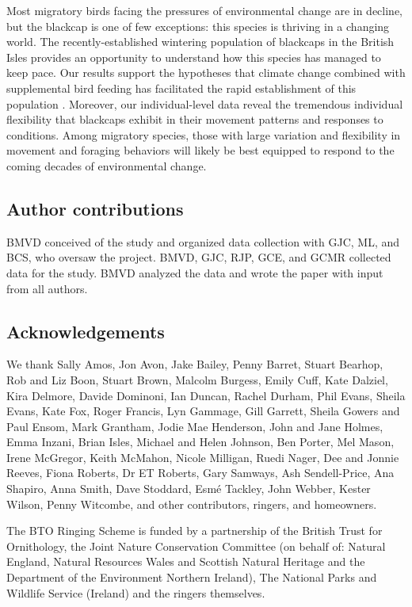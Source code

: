 \documentclass[a4paper, nobind]{templates/ociamthesis}
\begin{document}
Most migratory birds facing the pressures of environmental change are in decline, but the blackcap is one of few exceptions: this species is thriving in a changing world. The recently-established wintering population of blackcaps in the British Isles provides an opportunity to understand how this species has managed to keep pace. Our results support the hypotheses that climate change combined with supplemental bird feeding has facilitated the rapid establishment of this population \autocite{plummerSupplementaryFeedingGardens2015}. Moreover, our individual-level data reveal the tremendous individual flexibility that blackcaps exhibit in their movement patterns and responses to conditions. Among migratory species, those with large variation and flexibility in movement and foraging behaviors will likely be best equipped to respond to the coming decades of environmental change.

\hypertarget{author-contributions-1}{%
\subsection{Author contributions}\label{author-contributions-1}}

BMVD conceived of the study and organized data collection with GJC, ML, and BCS, who oversaw the project. BMVD, GJC, RJP, GCE, and GCMR collected data for the study. BMVD analyzed the data and wrote the paper with input from all authors.

\hypertarget{acknowledgements-1}{%
\subsection{Acknowledgements}\label{acknowledgements-1}}

We thank Sally Amos, Jon Avon, Jake Bailey, Penny Barret, Stuart Bearhop, Rob and Liz Boon, Stuart Brown, Malcolm Burgess, Emily Cuff, Kate Dalziel, Kira Delmore, Davide Dominoni, Ian Duncan, Rachel Durham, Phil Evans, Sheila Evans, Kate Fox, Roger Francis, Lyn Gammage, Gill Garrett, Sheila Gowers and Paul Ensom, Mark Grantham, Jodie Mae Henderson, John and Jane Holmes, Emma Inzani, Brian Isles, Michael and Helen Johnson, Ben Porter, Mel Mason, Irene McGregor, Keith McMahon, Nicole Milligan, Ruedi Nager, Dee and Jonnie Reeves, Fiona Roberts, Dr ET Roberts, Gary Samways, Ash Sendell-Price, Ana Shapiro, Anna Smith, Dave Stoddard, Esmé Tackley, John Webber, Kester Wilson, Penny Witcombe, and other contributors, ringers, and homeowners.

The BTO Ringing Scheme is funded by a partnership of the British Trust for Ornithology, the Joint Nature Conservation Committee (on behalf of: Natural England, Natural Resources Wales and Scottish Natural Heritage and the Department of the Environment Northern Ireland), The National Parks and Wildlife Service (Ireland) and the ringers themselves.
\end{document}
